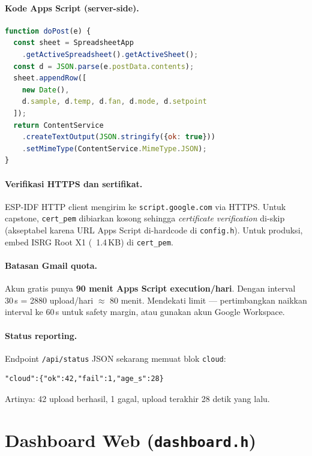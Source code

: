 \documentclass[11pt,a4paper]{article}
\begin{document}
\paragraph{Kode Apps Script (server-side).}
\begin{lstlisting}[language=JavaScript,caption={Apps Script \texttt{doPost} handler}]
function doPost(e) {
  const sheet = SpreadsheetApp
    .getActiveSpreadsheet().getActiveSheet();
  const d = JSON.parse(e.postData.contents);
  sheet.appendRow([
    new Date(),
    d.sample, d.temp, d.fan, d.mode, d.setpoint
  ]);
  return ContentService
    .createTextOutput(JSON.stringify({ok: true}))
    .setMimeType(ContentService.MimeType.JSON);
}
\end{lstlisting}

\paragraph{Verifikasi HTTPS dan sertifikat.}
ESP-IDF HTTP client mengirim ke \texttt{script.google.com} via HTTPS. Untuk capstone, \texttt{cert\_pem} dibiarkan kosong sehingga \emph{certificate verification} di-skip (akseptabel karena URL Apps Script di-hardcode di \texttt{config.h}). Untuk produksi, embed ISRG Root X1 (~1.4\,KB) di \texttt{cert\_pem}.

\paragraph{Batasan Gmail quota.}
Akun gratis punya \textbf{90 menit Apps Script execution/hari}. Dengan interval 30\,s = 2880 upload/hari $\approx$ 80 menit. Mendekati limit --- pertimbangkan naikkan interval ke 60\,s untuk safety margin, atau gunakan akun Google Workspace.

\paragraph{Status reporting.}
Endpoint \texttt{/api/status} JSON sekarang memuat blok \texttt{cloud}:
\begin{lstlisting}[caption={Tambahan field \texttt{cloud} di \texttt{/api/status}}]
"cloud":{"ok":42,"fail":1,"age_s":28}
\end{lstlisting}
Artinya: 42 upload berhasil, 1 gagal, upload terakhir 28 detik yang lalu.

\section{Dashboard Web (\texttt{dashboard.h})}
\end{document}
